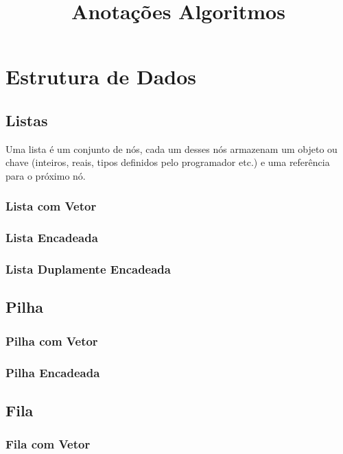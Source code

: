 \documentclass[10pt,a4paper]{article}
\title{Anotações Algoritmos}
\begin{document}
\maketitle
\tableofcontents
\newpage

\section{Estrutura de Dados}

\subsection{Listas}

\begin{df}
	Uma lista é um conjunto de nós, cada um desses nós armazenam um objeto ou chave (inteiros, reais, tipos definidos pelo programador etc.) e uma referência para o próximo nó.
\end{df}


\subsubsection{Lista com Vetor}
\subsubsection{Lista Encadeada}
\subsubsection{Lista Duplamente Encadeada}

\subsection{Pilha}
\subsubsection{Pilha com Vetor}
\subsubsection{Pilha Encadeada}

\subsection{Fila}
\subsubsection{Fila com Vetor}
\end{document}
